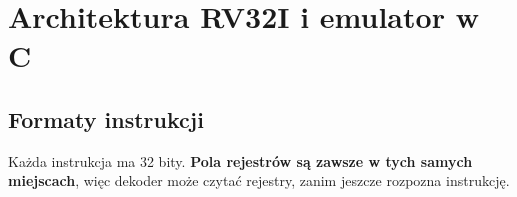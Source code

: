 \chapter{Architektura RV32I i emulator w C}
\label{ch:isa}


\section{Formaty instrukcji}

Każda instrukcja ma 32 bity. \textbf{Pola rejestrów są zawsze w tych samych
miejscach}, więc dekoder może czytać rejestry, zanim jeszcze rozpozna
instrukcję.

\newcommand{\pole}[5]{%
  \draw[thick, fill=#5] ({(31-#2)*0.42},#1) rectangle ({(32-#3)*0.42},{#1+0.62});
  \node[font=\sffamily\scriptsize] at ({(31-#2+32-#3)*0.21},{#1+0.31}) {#4};}


